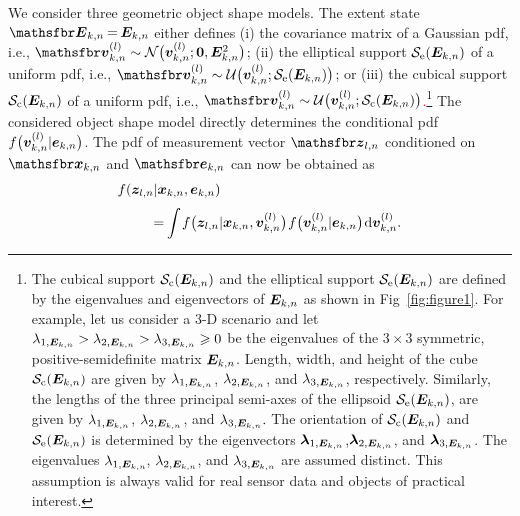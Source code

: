 \documentclass[10pt, twoside, romanappendices]{IEEEtran}
\providecommand{\ist}{\hspace*{.3mm}}
\providecommand{\rmv}{\hspace*{-.3mm}}
\providecommand{\nn}{\nonumber}
\begin{document}
We consider three geometric object shape models. The extent state $\RM{E}_{k,n} \rmv=\rmv \M{E}_{k,n}$ \vspace{-.2mm} either defines (i) the covariance matrix of a Gaussian \vspace{-.05mm} \ac{pdf}, i.e., $\RV{v}_{k,n}^{(l)} \sim \mathcal{N}\big(\V{v}^{(l)}_{k,n};\V{0},\M{E}^2_{k,n}\big) $; (ii) the elliptical support $\Set{S}_{\mathrm{e}}(\M{E}_{k,n})$ of a uniform \ac{pdf}, i.e., $\RV{v}_{k,n}^{(l)} \sim \mathcal{U}\big(\V{v}_{k,n}^{(l)};\Set{S}_{\mathrm{e}}(\M{E}_{k,n})\big)$; or (iii) the cubical support $\Set{S}_{\mathrm{c}}(\M{E}_{k,n})$ of a uniform \ac{pdf}, i.e., $\RV{v}_{k,n}^{(l)} \sim \mathcal{U}\big(\V{v}_{k,n}^{(l)};\Set{S}_{\mathrm{c}}(\M{E}_{k,n})\big)$\textcolor{red}{.}\footnote{The cubical support $\Set{S}_{\mathrm{c}}(\M{E}_{k,n})$ and the elliptical support $\Set{S}_{\mathrm{e}}(\M{E}_{k,n})$ are defined by the eigenvalues and eigenvectors of $\M{E}_{k,n}$ as shown in Fig~\ref{fig:figure1}. For example, let us \vspace{.2mm} consider a 3-D scenario and let $\lambda_{1,\M{E}_{k,n}} > \lambda_{2,\M{E}_{k,n}} > \lambda_{3,\M{E}_{k,n}} \geq 0$ be \vspace{0mm} the eigenvalues of the $3 \times 3$ symmetric, positive-semidefinite matrix $\M{E}_{k,n}$. Length, width, and height of the cube $\Set{S}_{\mathrm{c}}(\M{E}_{k,n})$ are given by $\lambda_{1,\M{E}_{k,n}}$, $\lambda_{2,\M{E}_{k,n}}$, and  $\lambda_{3,\M{E}_{k,n}}$, respectively. Similarly, the lengths of the three principal semi-axes of the ellipsoid $\Set{S}_{\mathrm{e}}(\M{E}_{k,n})$, are given by $\lambda_{1,\M{E}_{k,n}}$, $\lambda_{2,\M{E}_{k,n}}$, and $\lambda_{3,\M{E}_{k,n}}.$ The orientation of  $\Set{S}_{\mathrm{c}}(\M{E}_{k,n})$ and $\Set{S}_{\mathrm{e}}(\M{E}_{k,n})$ is determined by the eigenvectors $\V{\lambda}_{1,\M{E}_{k,n}}$,$\V{\lambda}_{2,\M{E}_{k,n}}$, and $\V{\lambda}_{3,\M{E}_{k,n}}$. The eigenvalues $\lambda_{1,\M{E}_{k,n}}\rmv$, $\lambda_{2,\M{E}_{k,n}}\rmv$, and $\lambda_{3,\M{E}_{k,n}}$ are assumed distinct. This assumption is always valid for real sensor data and objects of practical interest.} The considered object shape model directly determines the conditional \ac{pdf} $f\big(\bm{v}^{(l)}_{k,n} | \bm{e}_{k,n}\big)$. The \ac{pdf} of measurement vector $\RV{z}_{l,n}$ conditioned on $\RV{x}_{k,n}$ and $\RV{e}_{k,n}$ can now\vspace{0mm}  be obtained as
\begin{align}
&f(\V{z}_{l,n} | \V{x}_{k,n}, \V{e}_{k,n}) \nn \\[1mm]
&\hspace{8mm}= \rmv \int \rmv f\big(\V{z}_{l,n} |\V{x}_{k,n}, \V{v}^{(l)}_{k,n}\big) \ist f\big(\V{v}^{(l)}_{k,n} | \V{e}_{k,n}\big) \ist \mathrm{d} \V{v}^{(l)}_{k,n}. \label{eq:Likelihood1}
\end{align}
\end{document}
